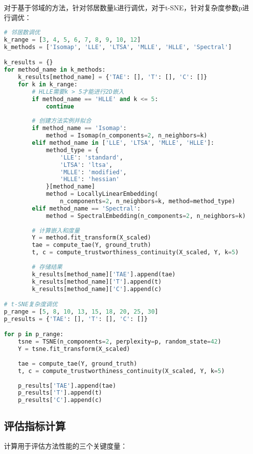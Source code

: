 \documentclass{article}
\begin{document}
对于基于邻域的方法，针对邻居数量k进行调优，对于t-SNE，针对复杂度参数p进行调优：

\begin{lstlisting}[language=Python]
# 邻居数调优
k_range = [3, 4, 5, 6, 7, 8, 9, 10, 12]
k_methods = ['Isomap', 'LLE', 'LTSA', 'MLLE', 'HLLE', 'Spectral']

k_results = {}
for method_name in k_methods:
    k_results[method_name] = {'TAE': [], 'T': [], 'C': []}
    for k in k_range:
        # HLLE需要k > 5才能进行2D嵌入
        if method_name == 'HLLE' and k <= 5:
            continue
            
        # 创建方法实例并拟合
        if method_name == 'Isomap':
            method = Isomap(n_components=2, n_neighbors=k)
        elif method_name in ['LLE', 'LTSA', 'MLLE', 'HLLE']:
            method_type = {
                'LLE': 'standard', 
                'LTSA': 'ltsa', 
                'MLLE': 'modified', 
                'HLLE': 'hessian'
            }[method_name]
            method = LocallyLinearEmbedding(
                n_components=2, n_neighbors=k, method=method_type)
        elif method_name == 'Spectral':
            method = SpectralEmbedding(n_components=2, n_neighbors=k)
            
        # 计算嵌入和度量
        Y = method.fit_transform(X_scaled)
        tae = compute_tae(Y, ground_truth)
        t, c = compute_trustworthiness_continuity(X_scaled, Y, k=5)
        
        # 存储结果
        k_results[method_name]['TAE'].append(tae)
        k_results[method_name]['T'].append(t)
        k_results[method_name]['C'].append(c)

# t-SNE复杂度调优
p_range = [5, 8, 10, 13, 15, 18, 20, 25, 30]
p_results = {'TAE': [], 'T': [], 'C': []}

for p in p_range:
    tsne = TSNE(n_components=2, perplexity=p, random_state=42)
    Y = tsne.fit_transform(X_scaled)
    
    tae = compute_tae(Y, ground_truth)
    t, c = compute_trustworthiness_continuity(X_scaled, Y, k=5)
    
    p_results['TAE'].append(tae)
    p_results['T'].append(t)
    p_results['C'].append(c)
\end{lstlisting}

\subsection{评估指标计算}

计算用于评估方法性能的三个关键度量：
\end{document}
